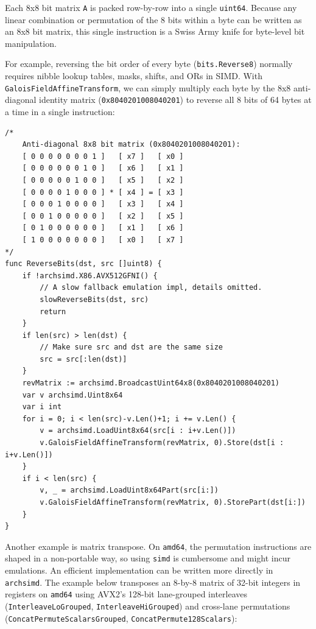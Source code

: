 \documentclass[11pt,a4paper]{article}
\begin{document}
Each 8x8 bit matrix \texttt{A} is packed row-by-row into a single \texttt{uint64}. Because any linear combination or permutation of the 8 bits within a byte can be written as an 8x8 bit matrix, this single instruction is a Swiss Army knife for byte-level bit manipulation.

For example, reversing the bit order of every byte (\texttt{bits.Reverse8}) normally requires nibble lookup tables, masks, shifts, and ORs in SIMD. With \texttt{GaloisFieldAffineTransform}, we can simply multiply each byte by the 8x8 anti-diagonal identity matrix (\texttt{0x8040201008040201}) to reverse all 8 bits of 64 bytes at a time in a single instruction:

\begin{verbatim}
/*
    Anti-diagonal 8x8 bit matrix (0x8040201008040201):
    [ 0 0 0 0 0 0 0 1 ]   [ x7 ]   [ x0 ]
    [ 0 0 0 0 0 0 1 0 ]   [ x6 ]   [ x1 ]
    [ 0 0 0 0 0 1 0 0 ]   [ x5 ]   [ x2 ]
    [ 0 0 0 0 1 0 0 0 ] * [ x4 ] = [ x3 ]
    [ 0 0 0 1 0 0 0 0 ]   [ x3 ]   [ x4 ]
    [ 0 0 1 0 0 0 0 0 ]   [ x2 ]   [ x5 ]
    [ 0 1 0 0 0 0 0 0 ]   [ x1 ]   [ x6 ]
    [ 1 0 0 0 0 0 0 0 ]   [ x0 ]   [ x7 ]
*/
func ReverseBits(dst, src []uint8) {
    if !archsimd.X86.AVX512GFNI() {
        // A slow fallback emulation impl, details omitted.
        slowReverseBits(dst, src)
        return
    }
    if len(src) > len(dst) {
        // Make sure src and dst are the same size
        src = src[:len(dst)]
    }
    revMatrix := archsimd.BroadcastUint64x8(0x8040201008040201)
    var v archsimd.Uint8x64
    var i int
    for i = 0; i < len(src)-v.Len()+1; i += v.Len() {
        v = archsimd.LoadUint8x64(src[i : i+v.Len()])
        v.GaloisFieldAffineTransform(revMatrix, 0).Store(dst[i : i+v.Len()])
    }
    if i < len(src) {
        v, _ = archsimd.LoadUint8x64Part(src[i:])
        v.GaloisFieldAffineTransform(revMatrix, 0).StorePart(dst[i:])
    }
}
\end{verbatim}

Another example is matrix transpose. On \texttt{amd64}, the permutation instructions are shaped in a non-portable way, so using \texttt{simd} is cumbersome and might incur emulations. An efficient implementation can be written more directly in \texttt{archsimd}. The example below transposes an 8-by-8 matrix of 32-bit integers in registers on \texttt{amd64} using AVX2's 128-bit lane-grouped interleaves (\texttt{InterleaveLoGrouped}, \texttt{InterleaveHiGrouped}) and cross-lane permutations (\texttt{ConcatPermuteScalarsGrouped}, \texttt{ConcatPermute128Scalars}):
\end{document}
